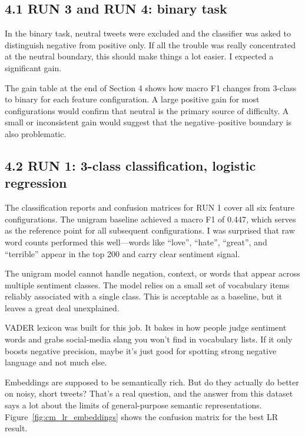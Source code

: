\documentclass[12pt]{article}
\begin{document}
\subsection*{4.1 RUN 3 and RUN 4: binary task}



In the binary task, neutral tweets were excluded and the classifier was asked to distinguish negative from positive only. If all the trouble was really concentrated at the neutral boundary, this should make things a lot easier. I expected a significant gain.

The gain table at the end of Section 4 shows how macro F1 changes from 3-class to binary for each feature configuration. A large positive gain for most configurations would confirm that neutral is the primary source of difficulty. A small or inconsistent gain would suggest that the negative--positive boundary is also problematic.



\subsection*{4.2 RUN 1: 3-class classification, logistic regression}



The classification reports and confusion matrices for RUN 1 cover all six feature configurations. The unigram baseline achieved a macro F1 of 0.447, which serves as the reference point for all subsequent configurations. I was surprised that raw word counts performed this well---words like ``love'', ``hate'', ``great'', and ``terrible'' appear in the top 200 and carry clear sentiment signal.

The unigram model cannot handle negation, context, or words that appear across multiple sentiment classes. The model relies on a small set of vocabulary items reliably associated with a single class. This is acceptable as a baseline, but it leaves a great deal unexplained.

VADER lexicon was built for this job. It bakes in how people judge sentiment words and grabs social-media slang you won't find in vocabulary lists. If it only boosts negative precision, maybe it's just good for spotting strong negative language and not much else.

Embeddings are supposed to be semantically rich. But do they actually do better on noisy, short tweets? That's a real question, and the answer from this dataset says a lot about the limits of general-purpose semantic representations. Figure~\ref{fig:cm_lr_embeddings} shows the confusion matrix for the best LR result.
\end{document}
